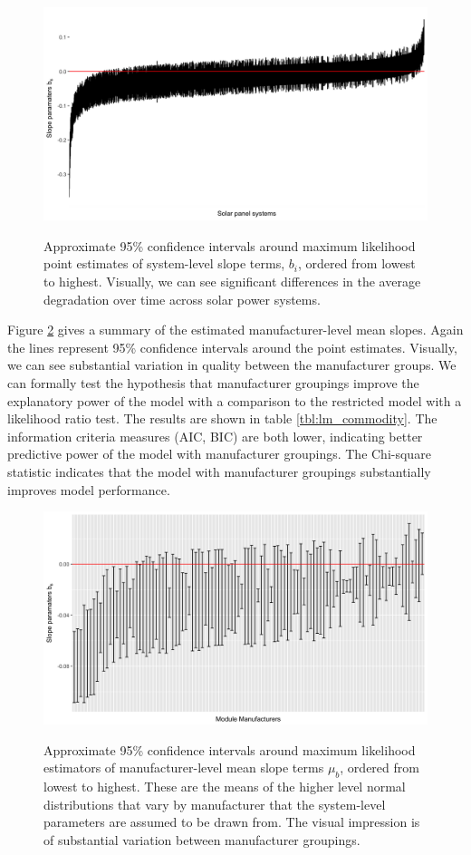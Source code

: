 \documentclass[a4paper]{article}
\begin{document}
\begin{figure}
  \caption{Approximate 95\% confidence intervals around maximum likelihood point estimates of system-level slope terms, $b_i$, ordered from lowest to highest. Visually, we can see significant differences in the average degradation over time across solar power systems.}
  \includegraphics[width=1\linewidth]{figures/sys_slope_fig.png}
  \label{sfig:sys_slope_fig}
\end{figure}

Figure \ref{sfig:nested_manuf_fig} gives a summary of the estimated manufacturer-level mean slopes. Again the lines represent 95\% confidence intervals around the point estimates. Visually, we can see substantial variation in quality between the manufacturer groups. We can formally test the hypothesis that manufacturer groupings improve the explanatory power of the model with a comparison to the restricted model with a likelihood ratio test. The results are shown in table \ref{tbl:lm_commodity}. The information criteria measures (AIC, BIC) are both lower, indicating better predictive power of the model with manufacturer groupings. The Chi-square statistic indicates that the model with manufacturer groupings substantially improves model performance.

\begin{figure}
  \caption{Approximate 95\% confidence intervals around maximum likelihood estimators of manufacturer-level mean slope terms $\mu_b$, ordered from lowest to highest. These are the means of the higher level normal distributions that vary by manufacturer that the system-level parameters are assumed to be drawn from. The visual impression is of substantial variation between manufacturer groupings.}
  \includegraphics[width=1\linewidth]{figures/nested_manuf_fig_final.png}
  \label{sfig:nested_manuf_fig}
\end{figure}
\end{document}
